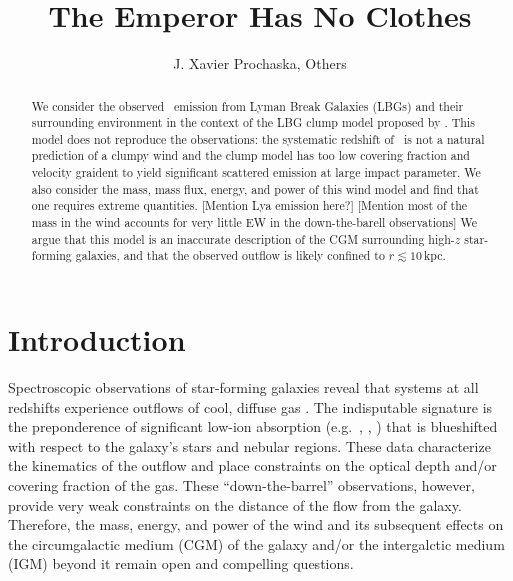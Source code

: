 \documentclass[12pt,preprint]{aastex}
\begin{document}
\title{The Emperor Has No Clothes}

\author{
J. Xavier Prochaska, 
Others
}

\begin{abstract}
We consider the observed \lya\ emission from Lyman Break Galaxies
(LBGs) and their surrounding environment in the context of the LBG
clump model proposed by \cite{steidel10}.  This model does not
reproduce the observations: the systematic redshift of \lya\ is not a
natural prediction of a clumpy wind and the clump model has too low
covering fraction and velocity graident to yield significant scattered
emission at large impact parameter.  We also consider the mass, mass
flux, energy, and power of this wind model and find that one requires
extreme quantities.  [Mention Lya emission here?]
[Mention most of the mass in the wind accounts for very little EW in
the down-the-barell observations]
We argue that this model is an inaccurate description of the CGM
surrounding high-$z$ star-forming galaxies, and that the observed
outflow is likely confined to $r \lesssim 10$\,kpc.
\end{abstract}


\section{Introduction}

Spectroscopic observations of star-forming galaxies reveal that 
systems at all redshifts experience outflows of cool, diffuse gas
\citep[e.g.][]{rupke,weiner,shapley03,rubin}.  The indisputable
signature is the preponderence of significant low-ion absorption
(e.g.\ , , ) that is
blueshifted with respect to the galaxy's stars and nebular regions.
These data characterize the kinematics of the outflow and place
constraints on the optical depth and/or covering fraction of the
gas.  These ``down-the-barrel'' observations, however, provide
very weak constraints on the distance of the flow from the galaxy.
Therefore, the mass, energy, and power of the wind and its subsequent
effects on the circumgalactic medium (CGM) of the galaxy and/or the
intergalctic medium (IGM) beyond it remain
open and compelling questions.
\end{document}
